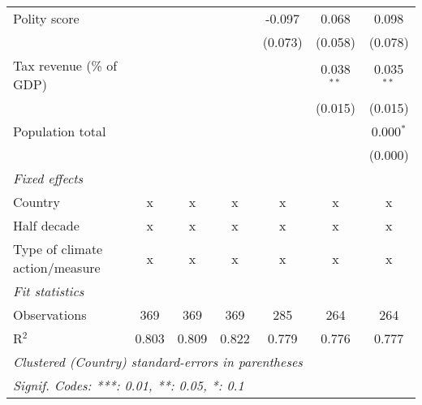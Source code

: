 \begin{tabular}{lcccccc}
   Polity score                                               &         &               &                & -0.097         & 0.068          & 0.098\\   
                                                              &         &               &                & (0.073)        & (0.058)        & (0.078)\\   
   Tax revenue (\% of GDP)                                    &         &               &                &                & 0.038$^{**}$   & 0.035$^{**}$\\   
                                                              &         &               &                &                & (0.015)        & (0.015)\\   
   Population total                                           &         &               &                &                &                & 0.000$^{*}$\\   
                                                              &         &               &                &                &                & (0.000)\\   
   \emph{Fixed effects}\\
   Country                                                    & x       & x             & x              & x              & x              & x\\  
   Half decade                                                & x       & x             & x              & x              & x              & x\\  
   Type of climate action/measure                             & x       & x             & x              & x              & x              & x\\  
   \midrule \emph{Fit statistics}\\
   Observations                                               & 369     & 369           & 369            & 285            & 264            & 264\\  
   R$^2$                                                      & 0.803   & 0.809         & 0.822          & 0.779          & 0.776          & 0.777\\  
   \midrule
   \multicolumn{7}{l}{\emph{Clustered (Country) standard-errors in parentheses}}\\
   \multicolumn{7}{l}{\emph{Signif. Codes: ***: 0.01, **: 0.05, *: 0.1}}\\
\end{tabular}
\par\endgroup


